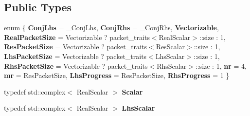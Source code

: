 \subsection*{Public Types}
\begin{DoxyCompactItemize}
\item 
\mbox{\label{class_eigen_1_1internal_1_1gebp__traits_3_01std_1_1complex_3_01_real_scalar_01_4_00_01std_1_1com3fbe501975c876a010def81ad2701521_ab9fc9d2cd0a1aec1496335df4e7ed106}} 
enum \{ \newline
{\bfseries Conj\+Lhs} = \+\_\+\+Conj\+Lhs, 
{\bfseries Conj\+Rhs} = \+\_\+\+Conj\+Rhs, 
{\bfseries Vectorizable}, 
{\bfseries Real\+Packet\+Size} = Vectorizable ? packet\+\_\+traits$<$Real\+Scalar$>$\+::size \+: 1, 
\newline
{\bfseries Res\+Packet\+Size} = Vectorizable ? packet\+\_\+traits$<$Res\+Scalar$>$\+::size \+: 1, 
{\bfseries Lhs\+Packet\+Size} = Vectorizable ? packet\+\_\+traits$<$Lhs\+Scalar$>$\+::size \+: 1, 
{\bfseries Rhs\+Packet\+Size} = Vectorizable ? packet\+\_\+traits$<$Rhs\+Scalar$>$\+::size \+: 1, 
{\bfseries nr} = 4, 
\newline
{\bfseries mr} = Res\+Packet\+Size, 
{\bfseries Lhs\+Progress} = Res\+Packet\+Size, 
{\bfseries Rhs\+Progress} = 1
 \}
\item 
\mbox{\label{class_eigen_1_1internal_1_1gebp__traits_3_01std_1_1complex_3_01_real_scalar_01_4_00_01std_1_1com3fbe501975c876a010def81ad2701521_a6b22305b9c087ee72833d41034be3027}} 
typedef std\+::complex$<$ Real\+Scalar $>$ {\bfseries Scalar}
\item 
\mbox{\label{class_eigen_1_1internal_1_1gebp__traits_3_01std_1_1complex_3_01_real_scalar_01_4_00_01std_1_1com3fbe501975c876a010def81ad2701521_ad752233b3f0ce6cf3c6b03d444f59730}} 
typedef std\+::complex$<$ Real\+Scalar $>$ {\bfseries Lhs\+Scalar}
\item 
\mbox{\label{class_eigen_1_1internal_1_1gebp__traits_3_01std_1_1complex_3_01_real_scalar_01_4_00_01std_1_1com3fbe501975c876a010def81ad2701521_aa92792f5c813141216db8be44fe6ad06}} 

\end{DoxyCompactItemize}
